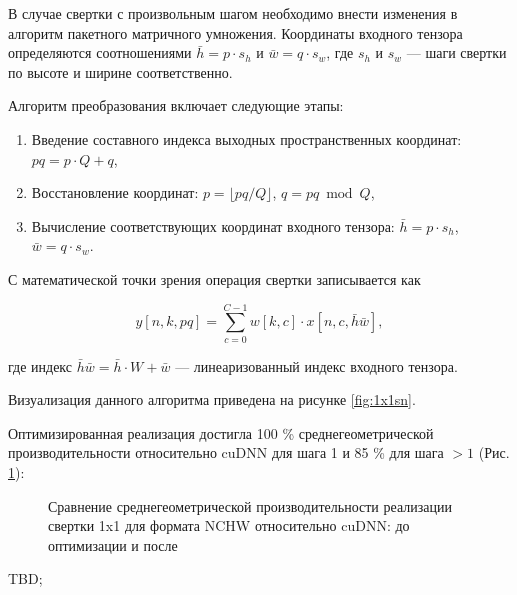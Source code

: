 В случае свертки с произвольным шагом необходимо внести изменения в алгоритм пакетного матричного умножения.
Координаты входного тензора определяются соотношениями $\bar{h} = p \cdot s_h$ и $\bar{w} = q \cdot s_w$, где $s_h$ и $s_w$ — шаги свертки по
высоте и ширине соответственно.

Алгоритм преобразования включает следующие этапы:
\begin{enumerate}
    \item Введение составного индекса выходных пространственных координат: $pq = p \cdot Q + q$,
    \item Восстановление координат: $p = \lfloor pq / Q \rfloor$, $q = pq \bmod Q$,
    \item Вычисление соответствующих координат входного тензора: $\bar{h} = p \cdot s_h$, $\bar{w} = q \cdot s_w$.
\end{enumerate}

С математической точки зрения операция свертки записывается как

\begin{equation}
y[n, k, pq] = \sum_{c=0}^{C-1} w[k, c] \cdot x[n, c, \bar{h}\bar{w}],
\end{equation}

где индекс $\bar{h}\bar{w} = \bar{h} \cdot W + \bar{w}$ — линеаризованный индекс входного тензора.

Визуализация данного алгоритма приведена на рисунке \ref{fig:1x1sn}.

Оптимизированная реализация достигла 100 \% среднегеометрической производительности относительно cuDNN для
шага 1 и 85 \% для шага $>1$ (Рис. \ref{fig:conv1x1_res}):

\begin{figure}[htbp]
\centering
{}
\caption{Сравнение среднегеометрической производительности реализации свертки 1x1 для формата
NCHW относительно cuDNN: до оптимизации и после}
\label{fig:conv1x1_res}
\end{figure}

TBD;